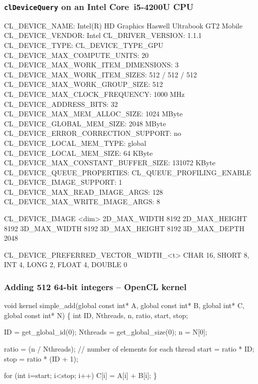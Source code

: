 \documentclass{beamer}
\begin{document}
\begin{frame}[fragile]
\frametitle{{\tt clDeviceQuery} on an Intel\textsuperscript{\textregistered} Core\texttrademark\ i5-4200U CPU}
\begin{semiverbatim}
\tiny
  CL_DEVICE_NAME:                       Intel(R) HD Graphics Haswell Ultrabook GT2 Mobile
  CL_DEVICE_VENDOR:                     Intel
  CL_DRIVER_VERSION:                    1.1.1
  CL_DEVICE_TYPE:                       CL_DEVICE_TYPE_GPU
  CL_DEVICE_MAX_COMPUTE_UNITS:          20
  CL_DEVICE_MAX_WORK_ITEM_DIMENSIONS:   3
  CL_DEVICE_MAX_WORK_ITEM_SIZES:        512 / 512 / 512 
  CL_DEVICE_MAX_WORK_GROUP_SIZE:        512
  CL_DEVICE_MAX_CLOCK_FREQUENCY:        1000 MHz
  CL_DEVICE_ADDRESS_BITS:               32
  CL_DEVICE_MAX_MEM_ALLOC_SIZE:         1024 MByte
  CL_DEVICE_GLOBAL_MEM_SIZE:            2048 MByte
  CL_DEVICE_ERROR_CORRECTION_SUPPORT:   no
  CL_DEVICE_LOCAL_MEM_TYPE:             global
  CL_DEVICE_LOCAL_MEM_SIZE:             64 KByte
  CL_DEVICE_MAX_CONSTANT_BUFFER_SIZE:   131072 KByte
  CL_DEVICE_QUEUE_PROPERTIES:           CL_QUEUE_PROFILING_ENABLE
  CL_DEVICE_IMAGE_SUPPORT:              1
  CL_DEVICE_MAX_READ_IMAGE_ARGS:        128
  CL_DEVICE_MAX_WRITE_IMAGE_ARGS:       8

  CL_DEVICE_IMAGE <dim>                 2D_MAX_WIDTH     8192
                                        2D_MAX_HEIGHT    8192
                                        3D_MAX_WIDTH     8192
                                        3D_MAX_HEIGHT    8192
                                        3D_MAX_DEPTH     2048

  CL_DEVICE_PREFERRED_VECTOR_WIDTH_<t>  CHAR 16, SHORT 8, INT 4, LONG 2, FLOAT 4, DOUBLE 0
\end{semiverbatim}
\end{frame}

\begin{frame}[fragile]
\frametitle{Adding 512 64-bit integers -- OpenCL kernel}
\begin{semiverbatim}
\tiny
void kernel simple_add(global const int* A, global const int* B, global int* C,
                       global const int* N) \{
    int ID, Nthreads, n, ratio, start, stop;

    ID = get_global_id(0);
    Nthreads = get_global_size(0);
    n = N[0];

    ratio = (n / Nthreads);  // number of elements for each thread
    start = ratio * ID;
    stop  = ratio * (ID + 1);

    for (int i=start; i<stop; i++)
        C[i] = A[i] + B[i];
\}
\end{semiverbatim}
\end{frame}
\end{document}
